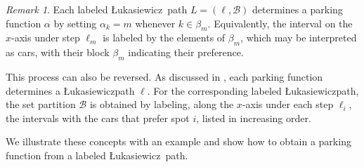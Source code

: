 \documentclass[12pt,reqno]{amsart}
\theoremstyle{definition}
\theoremstyle{remark}
\newtheorem{remark}{Remark}
\newcommand{\Luka}{\L ukasiewicz}
\begin{document}
  \begin{remark} 
  Each labeled \Luka~path $L = (\ell, \mathcal{B})$ determines a parking function $\alpha$ by setting  
   $\alpha_k = m$ whenever $k \in \beta_m$.  
   Equivalently, the interval on the $x$-axis under step $\ell_m$ is labeled by the elements of $\beta_m$,  
   which may be interpreted as cars, with their block $\beta_m$ indicating their preference. 

  This process can also be reversed. As discussed in , each parking function determines a \L{}ukasiewiczpath $\ell$. For the corresponding labeled \L{}ukasiewiczpath, the set partition $\mathcal{B}$ is obtained by labeling, along the $x$-axis under each step $\ell_i$, the intervals with the cars that prefer spot $i$, listed in increasing order. 
\end{remark}


We illustrate these concepts with an example and show how to obtain a parking function from a labeled \Luka~path.
\end{document}
